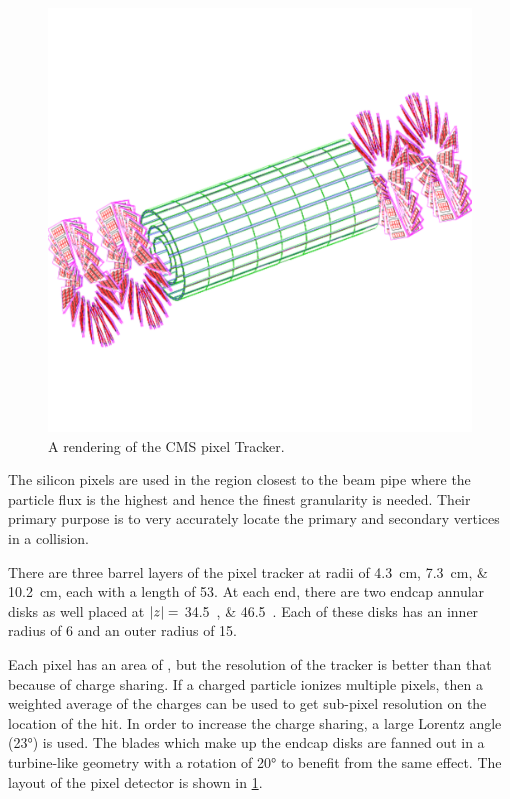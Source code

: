 \begin{figure}[!htbp]
    \centering
    \includegraphics[width=\textwidth]{figures/pixel_layout.pdf}
    \caption{
        A rendering of the CMS pixel Tracker.
    }
    \label{fig:pixel_layout}
\end{figure}

The silicon pixels are used in the region closest to the beam pipe where the
particle flux is the highest and hence the finest granularity is needed. Their
primary purpose is to very accurately locate the primary and secondary vertices
in a collision.

There are three barrel layers of the pixel tracker at radii of
\SIlist{4.3;7.3;10.2}{\centi\meter}, each with a length of
\SI{53}{\centi{\meter}}. At each end, there are two endcap annular disks as well
placed at $|z|=$ \SIlist{34.5;46.5}{\centi{\meter}}. Each of these disks
has an inner radius of \SI{6}{\centi{\meter}} and an outer radius of
\SI{15}{\centi{\meter}}.

Each pixel has an area of , but the
resolution of the tracker is better than that because of charge sharing. If a
charged particle ionizes multiple pixels, then a weighted average of the
charges can be used to get sub-pixel resolution on the location of the hit. In
order to increase the charge sharing, a large Lorentz angle (\ang{23}) is used.
The blades which make up the endcap disks are fanned out in a turbine-like
geometry with a rotation of \ang{20} to benefit from the same effect. The
layout of the pixel detector is shown in \cref{fig:pixel_layout}.


